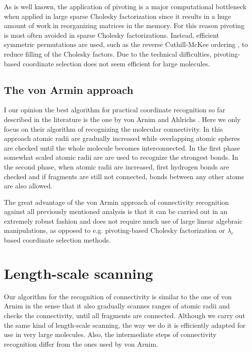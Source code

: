 \documentclass[prl,aps,preprint,superbib,12pt]{revtex4}
\begin{document}
As is well known, the application of pivoting
is a major computational bottleneck when applied in large sparse 
Cholesky factorization \cite{AGeorge81} 
since it results in a huge amount of work
in reorganizing matrices in the memory. For this reason pivoting is 
most often avoided in sparse Cholesky factorizations. Instead,
efficient symmetric permutations are used, such as the
reverse Cuthill-McKee ordering \cite{AGeorge81}, to reduce filling
of the Cholesky factors. Due to the technical difficulties,
pivoting-based coordinate selection does not seem efficient for large 
molecules.

\subsection{The von Armin approach}
I our opinion the best algorithm for practical 
coordinate recognition so far described
in the literature is the one by von Arnim and Ahlrichs 
\cite{MvonArnim99}. Here we only focus on their algorithm of 
recognizing the molecular connectivity. In this approach
atomic radii are gradually increased while overlapping atomic 
spheres are checked until the whole molecule becomes interconnected.   
In the first phase somewhat scaled atomic radii are are used
to recognize the strongest bonds. In the second phase, when 
atomic radii are increased, first hydrogen bonds are checked and 
if fragments are still not connected, bonds between any other atoms
are also allowed. 

The great advantage of the von Armin approach of
connectivity recognition against all previously
mentioned analysis is that it can be carried out in an extremely robust
fashion and does not require much use of large linear algebraic
manipulations, as opposed to e.g. pivoting-based Cholesky 
factorization or $\lambda_{c}$ based coordinate selection methods.

\section{Length-scale scanning}
\label{twoloops}
Our algorithm for the recognition of connectivity is similar
to the one of von Arnim in the sense that it also gradually scannes 
ranges of atomic radii and checks the connectivity, until all fragments
are connected. Although we carry out the same kind of length-scale
scanning, the way we do it is efficiently adapted for use in very large
molecules. Also, the intermediate steps of connectivity recognition
differ from the ones used by von Arnim.  
\end{document}
